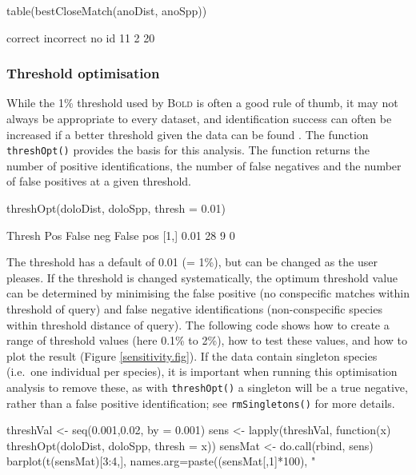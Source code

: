\documentclass{article}
\newcommand{\progname}[1]{\textsc{#1}}
\newcommand{\fun}[1]{\texttt{#1}}
\begin{document}
\begin{console}
table(bestCloseMatch(anoDist, anoSpp))
\end{console}

\begin{Routput}
  correct incorrect     no id 
       11         2        20 
\end{Routput}


\subsubsection{Threshold optimisation} %
While the 1\% threshold used by \progname{Bold} is often a good rule of thumb, it may not always be appropriate to every dataset, and identification success can often be increased if a better threshold given the data can be found  \citep{Meye.Paul.2005}.  The function \fun{threshOpt()} provides the basis for this analysis. The function returns the number of positive identifications, the number of false negatives and the number of false positives at a given threshold. 

\begin{console}
threshOpt(doloDist, doloSpp, thresh = 0.01)
\end{console}

\begin{Routput}
     Thresh Pos False neg False pos
[1,]   0.01  28         9         0
\end{Routput}

The threshold has a default of 0.01 (= 1\%), but can be changed as the user pleases. If the threshold is changed systematically, the optimum threshold value can be determined by minimising the false positive (no conspecific matches within threshold of query) and false negative identifications (non-conspecific species within threshold distance of query). The following code shows how to create a range of threshold values (here 0.1\% to 2\%), how to test these values, and how to plot the result (Figure \ref{sensitivity.fig}). If the data contain singleton species (i.e.\ one individual per species), it is important when running this optimisation analysis to remove these, as with \fun{threshOpt()} a singleton will be a true negative, rather than a false positive identification; see \fun{rmSingletons()} for more details.

\begin{console}
threshVal <- seq(0.001,0.02, by = 0.001)
sens <- lapply(threshVal, function(x) threshOpt(doloDist, doloSpp, thresh = x))
sensMat <- do.call(rbind, sens)
barplot(t(sensMat)[3:4,], names.arg=paste((sensMat[,1]*100), "%
\end{console}
\end{document}
